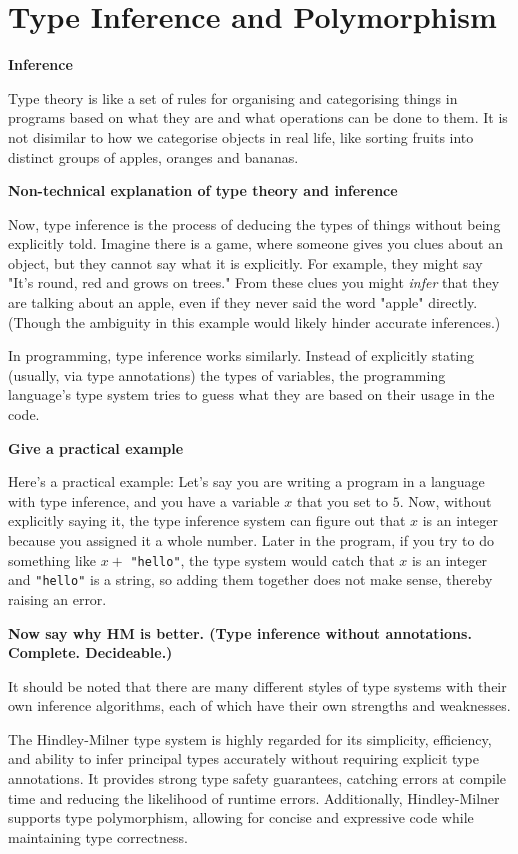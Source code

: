 \documentclass{l4proj}
\begin{document}
\section{Type Inference and Polymorphism}
\textbf{Inference}

Type theory is like a set of rules for organising and categorising things in programs based on what they are and what operations can be done to them.
It is not disimilar to how we categorise objects in real life, like sorting fruits into distinct groups of apples, oranges and bananas.

\textbf{Non-technical explanation of type theory and inference}

Now, type inference is the process of deducing the types of things without being explicitly told.
Imagine there is a game, where someone gives you clues about an object, but they cannot say what it is explicitly.
For example, they might say "It's round, red and grows on trees."
From these clues you might \emph{infer} that they are talking about an apple, even if they never said the word "apple" directly. 
(Though the ambiguity in this example would likely hinder accurate inferences.)

In programming, type inference works similarly.
Instead of explicitly stating (usually, via type annotations) the types of variables, the programming language's type system tries to guess what they are based on their usage in the code.

\textbf{Give a practical example}

Here's a practical example: Let's say you are writing a program in a language with type inference, and you have a variable $x$ that you set to $5$.
Now, without explicitly saying it, the type inference system can figure out that $x$ is an integer because you assigned it a whole number.
Later in the program, if you try to do something like $x +$ \texttt{"hello"}, the type system would catch that $x$ is an integer and \texttt{"hello"} is a string, so adding them together does not make sense, thereby raising an error.

\textbf{Now say why HM is better. (Type inference without annotations. Complete. Decideable.)}

It should be noted that there are many different styles of type systems with their own inference algorithms, each of which have their own strengths and weaknesses.

The Hindley-Milner type system is highly regarded for its simplicity, efficiency, and ability to infer principal types accurately without requiring explicit type annotations.
It provides strong type safety guarantees, catching errors at compile time and reducing the likelihood of runtime errors.
Additionally, Hindley-Milner supports type polymorphism, allowing for concise and expressive code while maintaining type correctness. 
\end{document}
